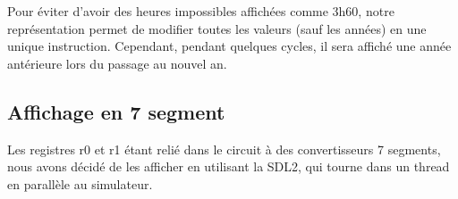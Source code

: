 \documentclass[a4paper]{article}
\begin{document}
Pour éviter d'avoir des heures impossibles affichées comme 3h60, notre
représentation permet de modifier toutes les valeurs (sauf les années) en une
unique instruction. Cependant, pendant quelques cycles, il sera affiché une
année antérieure lors du passage au nouvel an.



\subsection{Affichage en 7 segment}

Les registres r0 et r1 étant relié dans le circuit à des convertisseurs 7
segments, nous avons décidé de les afficher en utilisant la SDL2, qui tourne
dans un thread en parallèle au simulateur.
\end{document}
